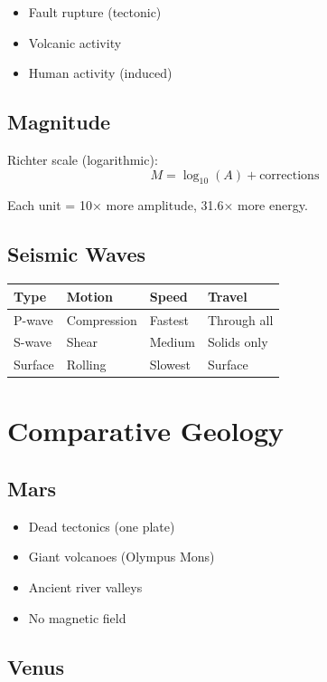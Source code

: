 \documentclass[
  11pt,
  letterpaper,
  twoside,
  openright]{book}
\providecommand{\tightlist}{%
  \setlength{\itemsep}{0pt}\setlength{\parskip}{0pt}}
\begin{document}
\begin{itemize}
\tightlist
\item
  Fault rupture (tectonic)
\item
  Volcanic activity
\item
  Human activity (induced)
\end{itemize}

\subsection{Magnitude}\label{magnitude}

Richter scale (logarithmic): \[
M = \log_{10}(A) + \text{corrections}
\]

Each unit = 10× more amplitude, 31.6× more energy.

\subsection{Seismic Waves}\label{seismic-waves}

\begin{longtable}[]{@{}llll@{}}
\toprule\noalign{}
Type & Motion & Speed & Travel \\
\midrule\noalign{}
\endhead
\bottomrule\noalign{}
\endlastfoot
P-wave & Compression & Fastest & Through all \\
S-wave & Shear & Medium & Solids only \\
Surface & Rolling & Slowest & Surface \\
\end{longtable}

\section{Comparative Geology}\label{comparative-geology}

\subsection{Mars}\label{mars-1}

\begin{itemize}
\tightlist
\item
  Dead tectonics (one plate)
\item
  Giant volcanoes (Olympus Mons)
\item
  Ancient river valleys
\item
  No magnetic field
\end{itemize}

\subsection{Venus}\label{venus-1}
\end{document}
